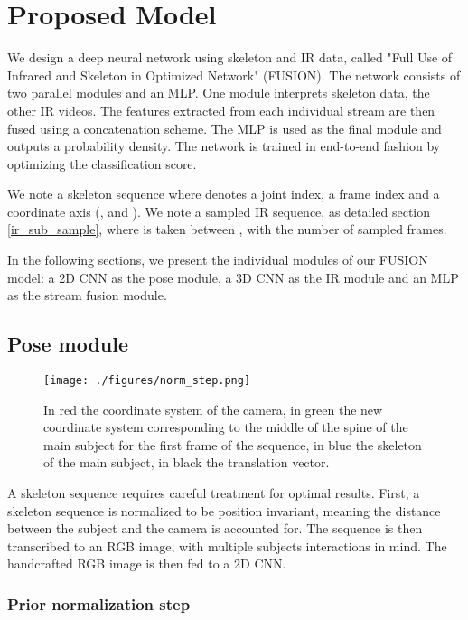 \documentclass[letterpaper, 10 pt, conference]{ieeeconf}
\begin{document}
\section{Proposed Model}

We design a deep neural network using skeleton and IR data, called "Full Use of Infrared and Skeleton in Optimized Network" (FUSION). The network consists of two parallel modules and an MLP. One module interprets skeleton data, the other IR videos. The features extracted from each individual stream are then fused using a concatenation scheme. The MLP is used as the final module and outputs a probability density. The network is trained in end-to-end fashion by optimizing the classification score. 

We note a skeleton sequence  where  denotes a joint index,  a frame index and  a coordinate axis (,  and ). We note  a sampled IR sequence, as detailed section \ref{ir_sub_sample}, where  is taken between , with  the number of sampled frames.

In the following sections, we present the individual modules of our FUSION model: a 2D CNN as the pose module, a 3D CNN as the IR module and an MLP as the stream fusion module. 

\subsection{Pose module}

\begin{figure}[t]
  \centering
  \texttt{[image: ./figures/norm\_step.png]}
  \caption{In red the coordinate system of the camera, in green the new coordinate system corresponding to the middle of the spine of the main subject for the first frame of the sequence, in blue the skeleton of the main subject, in black the translation vector.}
  \label{prior_norm_step}
\end{figure}

A skeleton sequence requires careful treatment for optimal results. First, a skeleton sequence is normalized to be position invariant, meaning the distance between the subject and the camera is accounted for. The sequence is then transcribed to an RGB image, with multiple subjects interactions in mind. The handcrafted RGB image is then fed to a 2D CNN. 

\subsubsection{Prior normalization step}
\end{document}
